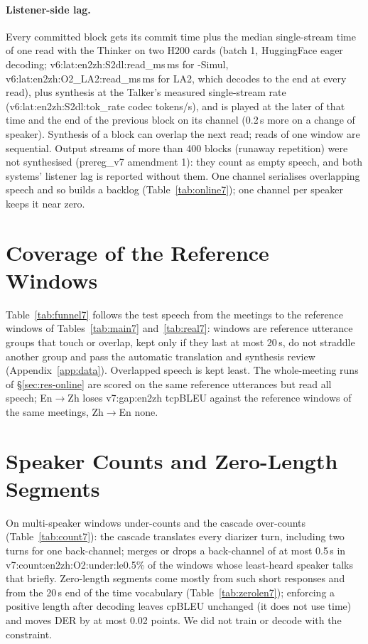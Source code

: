 \paragraph{Listener-side lag.} Every committed block gets its commit time plus the median single-stream time of one read
with the Thinker on two H200 cards (batch 1, HuggingFace eager decoding; \num{v6:lat:en2zh:S2dl:read_ms}\,ms for
\sys{}-Simul, \num{v6:lat:en2zh:O2_LA2:read_ms}\,ms for LA2, which decodes to the end at every read), plus synthesis at
the Talker's measured single-stream rate (\num{v6:lat:en2zh:S2dl:tok_rate} codec tokens/s), and is played at the later of
that time and the end of the previous block on its channel (0.2\,s more on a change of speaker). Synthesis of a block can
overlap the next read; reads of one window are sequential. Output streams of more than 400 blocks (runaway repetition)
were not synthesised (prereg\_v7 amendment 1): they count as empty speech, and both systems' listener lag is reported
without them. One channel serialises overlapping speech and so builds a backlog (Table~\ref{tab:online7}); one channel per
speaker keeps it near zero.

\section{Coverage of the Reference Windows}
\label{app:funnel7}



Table~\ref{tab:funnel7} follows the test speech from the meetings to the reference windows of Tables~\ref{tab:main7}
and~\ref{tab:real7}: windows are reference utterance groups that touch or overlap, kept only if they last at most 20\,s,
do not straddle another group and pass the automatic translation and synthesis review (Appendix~\ref{app:data}).
Overlapped speech is kept least. The whole-meeting runs of \S\ref{sec:res-online} are scored on the same reference
utterances but read all speech; En$\rightarrow$Zh loses \num{v7:gap:en2zh} tcpBLEU against the reference windows of the same
meetings, Zh$\rightarrow$En none.

\section{Speaker Counts and Zero-Length Segments}
\label{app:count7}




On multi-speaker windows \sys{} under-counts and the cascade over-counts (Table~\ref{tab:count7}): the cascade translates
every diarizer turn, including two turns for one back-channel; \sys{} merges or drops a back-channel of at most 0.5\,s in
\num{v7:count:en2zh:O2:under:le0.5}\% of the windows whose least-heard speaker talks that briefly. Zero-length segments
come mostly from such short responses and from the 20\,s end of the time vocabulary (Table~\ref{tab:zerolen7}); enforcing a
positive length after decoding leaves cpBLEU unchanged (it does not use time) and moves DER by at most 0.02 points. We did
not train or decode with the constraint.

